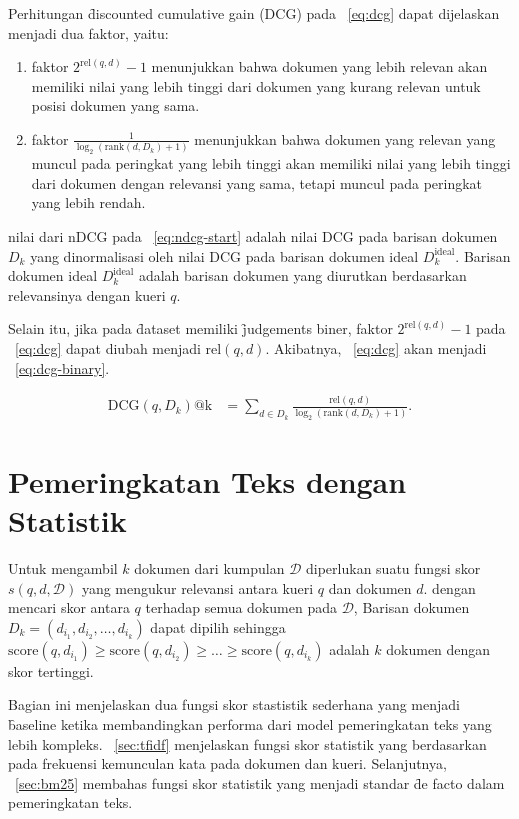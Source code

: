         Perhitungan \f{discounted cumulative gain} (DCG) pada \equ~\ref{eq:dcg} dapat dijelaskan menjadi dua faktor, yaitu:
        \begin{enumerate}
            \item faktor $2^{\text{rel}(q, d)} - 1$ menunjukkan bahwa dokumen yang lebih relevan akan memiliki nilai yang lebih tinggi dari dokumen yang kurang relevan untuk posisi dokumen yang sama.
            \item faktor $\frac{1}{\log_2(\text{rank}(d, D_k) + 1)}$ menunjukkan bahwa dokumen yang relevan yang muncul pada peringkat yang lebih tinggi akan memiliki nilai yang lebih tinggi dari dokumen dengan relevansi yang sama, tetapi muncul pada peringkat yang lebih rendah.
        \end{enumerate}

        nilai dari nDCG pada \equ~\ref{eq:ndcg-start} adalah nilai DCG pada barisan dokumen $D_k$ yang dinormalisasi oleh nilai DCG pada barisan dokumen ideal $D_k^{\text{ideal}}$. Barisan dokumen ideal $D_k^{\text{ideal}}$ adalah barisan dokumen yang diurutkan berdasarkan relevansinya dengan kueri $q$.

        Selain itu, jika pada \f{dataset} memiliki \f{judgements} biner, faktor $2^{\text{rel}(q, d)} - 1$ pada \equ~\ref{eq:dcg} dapat diubah menjadi $\text{rel}(q, d)$. Akibatnya, \equ~\ref{eq:dcg} akan menjadi \equ~\ref{eq:dcg-binary}.
        
        \begin{align}
        \label{eq:dcg-binary}
        \text{DCG}(q, D_k)\text{@k} &= \sum_{d \in D_k} \frac{\text{rel}(q, d)}{\log_2(\text{rank}(d, D_k) + 1)}.
        \end{align}


\section{Pemeringkatan Teks dengan Statistik}
        Untuk mengambil $k$ dokumen dari kumpulan $\mathcal{D}$ diperlukan suatu fungsi skor $s(q, d, \mathcal{D})$ yang mengukur relevansi antara kueri $q$ dan dokumen $d$. dengan mencari skor antara $q$ terhadap semua dokumen pada $\mathcal{D}$, Barisan dokumen $D_k = (d_{i_1}, d_{i_2},\dots, d_{i_k})$ dapat dipilih sehingga $\text{score}(q, d_{i_1}) \geq \text{score}(q, d_{i_2}) \geq \dots \geq \text{score}(q, d_{i_k})$ adalah $k$ dokumen dengan skor tertinggi.
        
        Bagian ini menjelaskan dua fungsi skor stastistik sederhana yang menjadi \f{baseline} ketika membandingkan performa dari model pemeringkatan teks yang lebih kompleks. \sect~\ref{sec:tfidf} menjelaskan fungsi skor statistik yang berdasarkan pada frekuensi kemunculan kata pada dokumen dan kueri. Selanjutnya, \sect~\ref{sec:bm25} membahas fungsi skor statistik yang menjadi standar \f{de facto} dalam pemeringkatan teks.

